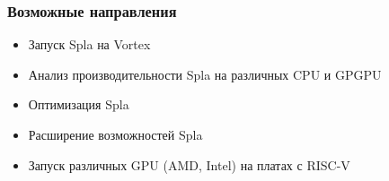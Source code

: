 \documentclass[xcolor=table,aspectratio=169]{beamer}
\begin{document}
\begin{frame}[fragile]
  \frametitle{Возможные направления}
  \begin{itemize}
    \item Запуск Spla на Vortex
    \item Анализ производительности Spla на различных CPU и GPGPU    
    \item Оптимизация Spla
    \item Расширение возможностей Spla
    \item Запуск различных GPU (AMD, Intel) на платах с RISC-V
  \end{itemize}
\end{frame}
\end{document}
